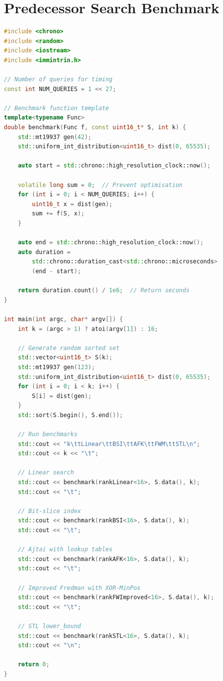 \section{Predecessor Search Benchmark}
\label{sec:pred-benchmark}

\begin{lstlisting}[language=C++, caption={Predecessor search timing benchmark}, label={lst:pred-bench}]
#include <chrono>
#include <random>
#include <iostream>
#include <immintrin.h>

// Number of queries for timing
const int NUM_QUERIES = 1 << 27;

// Benchmark function template
template<typename Func>
double benchmark(Func f, const uint16_t* S, int k) {
    std::mt19937 gen(42);
    std::uniform_int_distribution<uint16_t> dist(0, 65535);

    auto start = std::chrono::high_resolution_clock::now();

    volatile long sum = 0;  // Prevent optimisation
    for (int i = 0; i < NUM_QUERIES; i++) {
        uint16_t x = dist(gen);
        sum += f(S, x);
    }

    auto end = std::chrono::high_resolution_clock::now();
    auto duration =
        std::chrono::duration_cast<std::chrono::microseconds>
        (end - start);

    return duration.count() / 1e6;  // Return seconds
}

int main(int argc, char* argv[]) {
    int k = (argc > 1) ? atoi(argv[1]) : 16;

    // Generate random sorted set
    std::vector<uint16_t> S(k);
    std::mt19937 gen(123);
    std::uniform_int_distribution<uint16_t> dist(0, 65535);
    for (int i = 0; i < k; i++) {
        S[i] = dist(gen);
    }
    std::sort(S.begin(), S.end());

    // Run benchmarks
    std::cout << "k\ttLinear\ttBSI\ttAFK\ttFWM\ttSTL\n";
    std::cout << k << "\t";

    // Linear search
    std::cout << benchmark(rankLinear<16>, S.data(), k);
    std::cout << "\t";

    // Bit-slice index
    std::cout << benchmark(rankBSI<16>, S.data(), k);
    std::cout << "\t";

    // Ajtai with lookup tables
    std::cout << benchmark(rankAFK<16>, S.data(), k);
    std::cout << "\t";

    // Improved Fredman with XOR-MinPos
    std::cout << benchmark(rankFWImproved<16>, S.data(), k);
    std::cout << "\t";

    // STL lower_bound
    std::cout << benchmark(rankSTL<16>, S.data(), k);
    std::cout << "\n";

    return 0;
}
\end{lstlisting}


